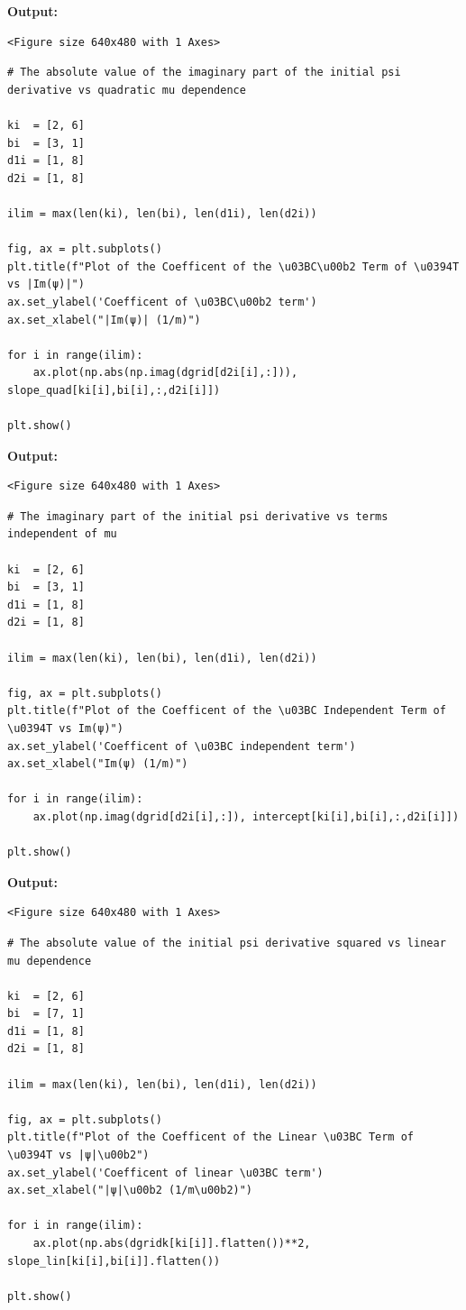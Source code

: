 \documentclass{article}
\begin{document}
\textbf{Output:}\begin{verbatim}
<Figure size 640x480 with 1 Axes>
\end{verbatim}

\begin{lstlisting}
# The absolute value of the imaginary part of the initial psi derivative vs quadratic mu dependence

ki  = [2, 6]
bi  = [3, 1]
d1i = [1, 8]
d2i = [1, 8]

ilim = max(len(ki), len(bi), len(d1i), len(d2i))

fig, ax = plt.subplots()
plt.title(f"Plot of the Coefficent of the \u03BC\u00b2 Term of \u0394T vs |Im(ψ)|")
ax.set_ylabel('Coefficent of \u03BC\u00b2 term')
ax.set_xlabel("|Im(ψ)| (1/m)")

for i in range(ilim):
    ax.plot(np.abs(np.imag(dgrid[d2i[i],:])), slope_quad[ki[i],bi[i],:,d2i[i]])

plt.show()\end{lstlisting}

\textbf{Output:}\begin{verbatim}
<Figure size 640x480 with 1 Axes>
\end{verbatim}

\begin{lstlisting}
# The imaginary part of the initial psi derivative vs terms independent of mu

ki  = [2, 6]
bi  = [3, 1]
d1i = [1, 8]
d2i = [1, 8]

ilim = max(len(ki), len(bi), len(d1i), len(d2i))

fig, ax = plt.subplots()
plt.title(f"Plot of the Coefficent of the \u03BC Independent Term of \u0394T vs Im(ψ)")
ax.set_ylabel('Coefficent of \u03BC independent term')
ax.set_xlabel("Im(ψ) (1/m)")

for i in range(ilim):
    ax.plot(np.imag(dgrid[d2i[i],:]), intercept[ki[i],bi[i],:,d2i[i]])

plt.show()\end{lstlisting}

\textbf{Output:}\begin{verbatim}
<Figure size 640x480 with 1 Axes>
\end{verbatim}

\begin{lstlisting}
# The absolute value of the initial psi derivative squared vs linear mu dependence

ki  = [2, 6]
bi  = [7, 1]
d1i = [1, 8]
d2i = [1, 8]

ilim = max(len(ki), len(bi), len(d1i), len(d2i))

fig, ax = plt.subplots()
plt.title(f"Plot of the Coefficent of the Linear \u03BC Term of \u0394T vs |ψ|\u00b2")
ax.set_ylabel('Coefficent of linear \u03BC term')
ax.set_xlabel("|ψ|\u00b2 (1/m\u00b2)")

for i in range(ilim):
    ax.plot(np.abs(dgridk[ki[i]].flatten())**2, slope_lin[ki[i],bi[i]].flatten())

plt.show()\end{lstlisting}
\end{document}
